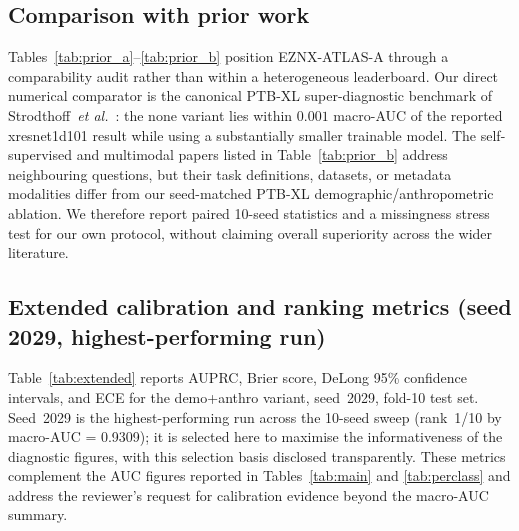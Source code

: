 \documentclass[mathematics,article,submit,pdftex]{Definitions/mdpi}
\def\texttt#1{#1}%
\begin{document}
\subsection{Comparison with prior work}
Tables~\ref{tab:prior_a}--\ref{tab:prior_b} position EZNX-ATLAS-A through a comparability audit rather than within a heterogeneous leaderboard. Our direct numerical comparator is the canonical PTB-XL super-diagnostic benchmark of Strodthoff~\textit{et al.}~\cite{Strodthoff2021}: the \texttt{none} variant lies within $0.001$ macro-AUC of the reported xresnet1d101 result while using a substantially smaller trainable model. The self-supervised and multimodal papers listed in Table~\ref{tab:prior_b} address neighbouring questions, but their task definitions, datasets, or metadata modalities differ from our seed-matched PTB-XL demographic/anthropometric ablation. We therefore report paired 10-seed statistics and a missingness stress test for our own protocol, without claiming overall superiority across the wider literature.

\subsection{Extended calibration and ranking metrics (seed 2029, highest-performing run)}
\label{sec:extended}
Table~\ref{tab:extended} reports AUPRC, Brier score, DeLong 95\% confidence intervals, and ECE for the \texttt{demo+anthro} variant, seed~2029, fold-10 test set. Seed~2029 is the highest-performing run across the 10-seed sweep (rank~1/10 by macro-AUC = 0.9309); it is selected here to maximise the informativeness of the diagnostic figures, with this selection basis disclosed transparently. These metrics complement the AUC figures reported in Tables~\ref{tab:main} and \ref{tab:perclass} and address the reviewer's request for calibration evidence beyond the macro-AUC summary.
\end{document}
